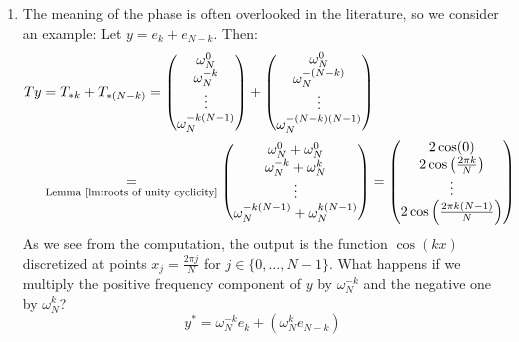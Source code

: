 \begin{remark}
\begin{enumerate}[label = \theremark.\arabic*]
\begin{figure}[htbp]
			      \caption{286 discrete points}
		      \end{figure}
		\item \label{ex:phase shift} The meaning of the phase is often overlooked in the literature, so we consider an example:
		      Let $y = e_k + e_{N-k}$. Then:
		      \[\begin{aligned}
				      Ty
				       & = T_{*k} + T_{*(N-k)}
				      =
				      \begin{pmatrix}
					      \omega_N^{0}  \\
					      \omega_N^{-k} \\
					      \vdots        \\
					      \omega_N^{-k(N-1)}
				      \end{pmatrix}
				      + \begin{pmatrix}
					        \omega_N^{0}      \\
					        \omega_N^{-(N-k)} \\
					        \vdots            \\
					        \omega_N^{-(N-k)(N-1)}
				        \end{pmatrix}
				      \\ &\underset{\text{Lemma \ref{lm:roots of unity cyclicity}}}{=} \begin{pmatrix}
					      \omega_N^{0} + \omega_N^{0}  \\
					      \omega_N^{-k} + \omega_N^{k} \\
					      \vdots                       \\
					      \omega_N^{-k(N-1)} + \omega_N^{k(N-1)}
				      \end{pmatrix}
				      =
				      \begin{pmatrix}
					      2\cos(0)                           \\
					      2\cos\left(\frac{2\pi k}{N}\right) \\
					      \vdots                             \\
					      2\cos\left(\frac{2\pi k(N-1)}{N}\right)
				      \end{pmatrix}
			      \end{aligned}\]
		      As we see from the computation, the output is the function $\cos (kx)$ discretized at points $x_j=\frac{2\pi j}{N}$ for $j\in \{0, \dots, N-1\}$. What happens if we multiply the positive frequency component of $y$ by $\omega_N^{-k}$ and the negative one by $\omega_N^{k}$?
		      \[y^* = \omega_N^{-k}e_k + (\omega_N^{k}e_{N-k})\]
		      \[\begin{aligned}

\end{aligned}\]
\end{enumerate}
\end{remark}
